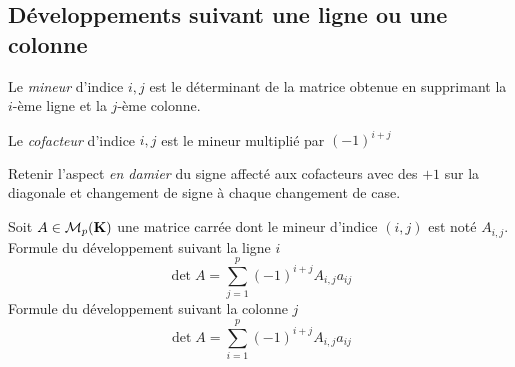 \subsection{Développements suivant une ligne ou une colonne}
\begin{defi}
 \begin{description}
 \item 
\end{description}
\item {} Le \emph{mineur} d'indice $i,j$ est le déterminant de la matrice obtenue en supprimant la $i$-ème ligne et la $j$-ème colonne.
\item {} Le \emph{cofacteur} d'indice $i,j$ est le mineur multiplié par $(-1)^{i+j}$
\end{defi}
Retenir l'aspect \emph{en damier} du signe affecté aux cofacteurs avec des $+1$ sur la diagonale et changement de signe à chaque changement de case.
\begin{propn}
Soit $A\in \mathcal M_p(\mathbf{K})$ une matrice carrée dont le mineur d'indice $(i,j)$ est noté $A_{i,j}$.\newline
Formule du développement suivant la ligne $i$
 \begin{displaymath}
 \det A = \sum_{j=1}^p (-1)^{i+j}A_{i,j}a_{ij}
\end{displaymath}
Formule du développement suivant la colonne $j$
 \begin{displaymath}
 \det A = \sum_{i=1}^p (-1)^{i+j}A_{i,j}a_{ij}
\end{displaymath}
\end{propn}
\clearpage
